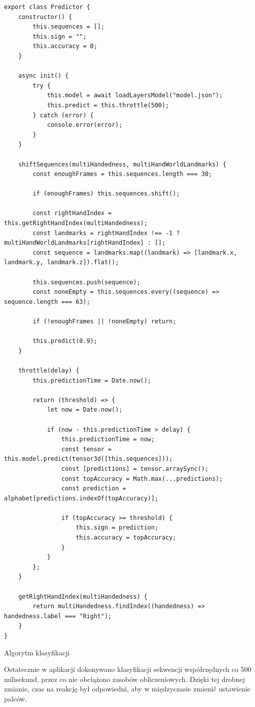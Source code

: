 \begin{listing}[H]
    \color{white}
    \begin{verbatim}
export class Predictor {
    constructor() {
        this.sequences = [];
        this.sign = "";
        this.accuracy = 0;
    }

    async init() {
        try {
            this.model = await loadLayersModel("model.json");
            this.predict = this.throttle(500);
        } catch (error) {
            console.error(error);
        }
    }

    shiftSequences(multiHandedness, multiHandWorldLandmarks) {
        const enoughFrames = this.sequences.length === 30;

        if (enoughFrames) this.sequences.shift();

        const rightHandIndex = this.getRightHandIndex(multiHandedness);
        const landmarks = rightHandIndex !== -1 ? multiHandWorldLandmarks[rightHandIndex] : [];
        const sequence = landmarks.map((landmark) => [landmark.x, landmark.y, landmark.z]).flat();

        this.sequences.push(sequence);
        const noneEmpty = this.sequences.every((sequence) => sequence.length === 63);

        if (!enoughFrames || !noneEmpty) return;

        this.predict(0.9);
    }

    throttle(delay) {
        this.predictionTime = Date.now();

        return (threshold) => {
            let now = Date.now();

            if (now - this.predictionTime > delay) {
                this.predictionTime = now;
                const tensor = this.model.predict(tensor3d([this.sequences]));
                const [predictions] = tensor.arraySync();
                const topAccuracy = Math.max(...predictions);
                const prediction = alphabet[predictions.indexOf(topAccuracy)];

                if (topAccuracy >= threshold) {
                    this.sign = prediction;
                    this.accuracy = topAccuracy;
                }
            }
        };
    }

    getRightHandIndex(multiHandedness) {
        return multiHandedness.findIndex((handedness) => handedness.label === "Right");
    }
}
    \end{verbatim}
    \caption{Algorytm klasyfikacji}
    \label{lst:classification-algorithm}
\end{listing}

Ostatecznie w aplikacji dokonywano klasyfikacji sekwencji współrzędnych co 500 milisekund, przez co nie obciążono zasobów obliczeniowych. Dzięki tej drobnej zmianie, czas na reakcję był odpowiedni, aby w międzyczasie zmienić ustawienie palców.
